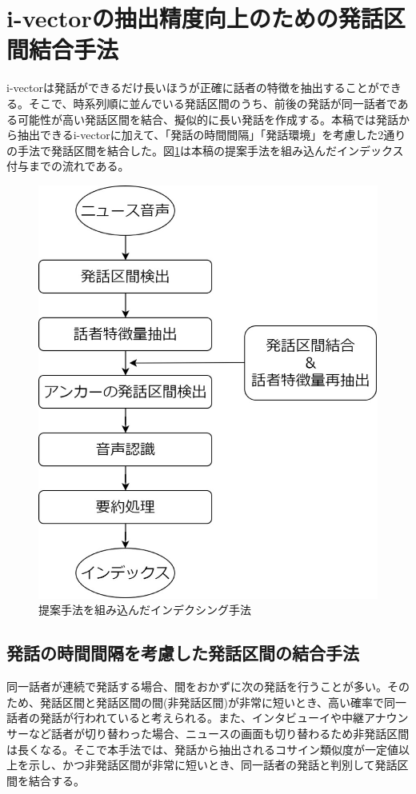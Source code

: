 \section{i-vectorの抽出精度向上のための発話区間結合手法}
\label{chapter:prob_method}
i-vectorは発話ができるだけ長いほうが正確に話者の特徴を抽出することができる。そこで、時系列順に並んでいる発話区間のうち、前後の発話が同一話者である可能性が高い発話区間を結合、擬似的に長い発話を作成する。本稿では発話から抽出できるi-vectorに加えて、「発話の時間間隔」「発話環境」を考慮した2通りの手法で発話区間を結合した。図\ref{fig:indexing2}は本稿の提案手法を組み込んだインデックス付与までの流れである。

\begin{figure}[H]
  \begin{center}
    \includegraphics[scale=0.3]{./figure/indexing2.eps}
  \end{center}
  \caption{提案手法を組み込んだインデクシング手法 \label{fig:indexing2}}
\end{figure}

\subsection{発話の時間間隔を考慮した発話区間の結合手法}
\label{prob1}
同一話者が連続で発話する場合、間をおかずに次の発話を行うことが多い。そのため、発話区間と発話区間の間(非発話区間)が非常に短いとき、高い確率で同一話者の発話が行われていると考えられる。また、インタビューイや中継アナウンサーなど話者が切り替わった場合、ニュースの画面も切り替わるため非発話区間は長くなる。そこで本手法では、発話から抽出されるコサイン類似度が一定値以上を示し、かつ非発話区間が非常に短いとき、同一話者の発話と判別して発話区間を結合する。

